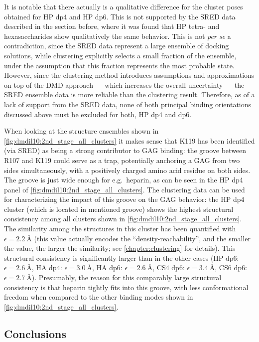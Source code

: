 It is notable that there actually is a qualitative difference for the cluster
poses obtained for HP dp4 and HP dp6. This is not supported by the SRED data
described in the section before, where it was found that HP tetra- and
hexasaccharides show qualitatively the same behavior. This is not \textit{per
se} a contradiction, since the SRED data represent a large ensemble of docking
solutions, while clustering explicitly selects a small fraction of the ensemble,
under the assumption that this fraction represents the most probable state.
However, since the clustering method introduces assumptions and approximations
on top of the DMD approach --- which increases the overall uncertainty --- the
SRED ensemble data is more reliable than the clustering result. Therefore, as of
a lack of support from the SRED data, none of both principal binding
orientations discussed above must be excluded for both, HP dp4 and dp6.

When looking at the structure ensembles shown in
\cref{fig:dmdil10:2nd_stage_all_clusters} it makes sense that K119 has been
identified (via SRED) as being a strong contributor to GAG binding: the groove
between R107 and K119 could serve as a trap, potentially anchoring a GAG from
two sides simultaneously, with a positively charged amino acid residue on both
sides. The groove is just wide enough for e.g.\ heparin, as can be seen in the
HP dp4 panel of \cref{fig:dmdil10:2nd_stage_all_clusters}. The clustering data
can be used for characterizing the impact of this groove on the GAG behavior:
the HP dp4 cluster (which is located in mentioned groove) shows the highest
structural consistency among all clusters shown in
\cref{fig:dmdil10:2nd_stage_all_clusters}. The similarity among the structures
in this cluster has been quantified with $\epsilon = \SI{2.2}{\angstrom}$ (this
value actually encodes the \enquote{density-reachability}, and the smaller the
value, the larger the similarity; see \cref{chapter:clustering} for details).
This structural consistency is significantly larger than in the other cases (HP
dp6: $\epsilon = \SI{2.6}{\angstrom}$, HA dp4: $\epsilon = \SI{3.0}{\angstrom}$,
HA dp6: $\epsilon = \SI{2.6}{\angstrom}$, CS4 dp6: $\epsilon =
\SI{3.4}{\angstrom}$, CS6 dp6: $\epsilon = \SI{2.7}{\angstrom}$). Presumably,
the reason for this comparably large structural consistency is that heparin
tightly fits into this groove, with less conformational freedom when compared to
the other binding modes shown in \cref{fig:dmdil10:2nd_stage_all_clusters}.


\subsection{Conclusions}

